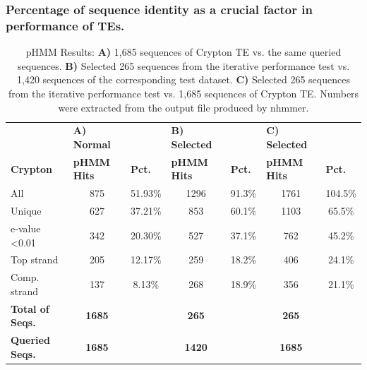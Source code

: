 \documentclass[unnumsec,webpdf,contemporary,large]{oup-authoring-template}%
\theoremstyle{thmstyleone}%
\theoremstyle{thmstyletwo}%
\theoremstyle{thmstylethree}%
\begin{document}
\subsubsection{Percentage of sequence identity as a crucial factor in performance of TEs.}\label{subsubsec3_1}
\begin{table}[!t]
\caption{pHMM Results: \textbf{A)} 1,685 sequences of Crypton TE vs. the same queried sequences. \textbf{B)} Selected 265 sequences from the iterative performance test vs. 1,420 sequences of the corresponding test dataset. \textbf{C)} Selected 265 sequences from the iterative performance test vs. 1,685 sequences of Crypton TE. Numbers were extracted from the output file produced by nhmmer. }
\label{table:tab4}
\begin{tabular*}{\textwidth}{@{\extracolsep{\fill}}lcccccc@{\extracolsep{\fill}}}
\toprule
 &
  \multicolumn{1}{l}{\textbf{A) Normal}} &
  \multicolumn{1}{l}{} &
  \multicolumn{1}{l}{\textbf{B) Selected}} &
  \multicolumn{1}{l}{} &
  \multicolumn{1}{l}{\textbf{C) Selected}} &
  \multicolumn{1}{l}{} \\
\textbf{Crypton} &
  \multicolumn{1}{l}{\textbf{pHMM Hits}} &
  \multicolumn{1}{l}{\textbf{Pct.}} &
  \multicolumn{1}{l}{\textbf{pHMM Hits}} &
  \multicolumn{1}{l}{\textbf{Pct.}} &
  \multicolumn{1}{l}{\textbf{pHMM Hits}} &
  \multicolumn{1}{l}{\textbf{Pct.}} \\
\midrule
All                     & 875           & 51.93\%              & 1296          & 91.3\%               & 1761          & 104.5\%              \\
Unique                  & 627           & 37.21\%              & 853           & 60.1\%               & 1103          & 65.5\%               \\
e-value \textless 0.01  & 342           & 20.30\%              & 527           & 37.1\%               & 762           & 45.2\%               \\
Top strand              & 205           & 12.17\%              & 259           & 18.2\%               & 406           & 24.1\%               \\
Comp. strand            & 137           & 8.13\%               & 268           & 18.9\%               & 356           & 21.1\%               \\
\textbf{Total of Seqs.} & \textbf{1685} & \multicolumn{1}{l}{} & \textbf{265}  & \multicolumn{1}{l}{} & \textbf{265}  & \multicolumn{1}{l}{} \\
\textbf{Queried Seqs.}  & \textbf{1685} & \multicolumn{1}{l}{} & \textbf{1420} & \multicolumn{1}{l}{} & \textbf{1685} & \multicolumn{1}{l}{} \\
\bottomrule
\end{tabular*}
\end{table}
\raggedbottom
\end{document}
